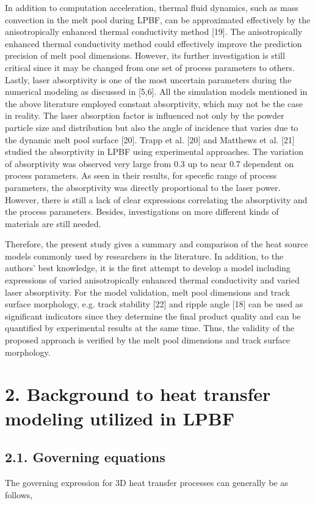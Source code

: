 \documentclass[10pt]{article}
\begin{document}
In addition to computation acceleration, thermal fluid dynamics, such as mass convection in the melt pool during LPBF, can be approximated effectively by the anisotropically enhanced thermal conductivity method [19]. The anisotropically enhanced thermal conductivity method could effectively improve the prediction precision of melt pool dimensions. However, its further investigation is still critical since it may be changed from one set of process parameters to others. Lastly, laser absorptivity is one of the most uncertain parameters during the numerical modeling as discussed in [5,6]. All the simulation models mentioned in the above literature employed constant absorptivity, which may not be the case in reality. The laser absorption factor is influenced not only by the powder particle size and distribution but also the angle of incidence that varies due to the dynamic melt pool surface [20]. Trapp et al. [20] and Matthews et al. [21] studied the absorptivity in LPBF using experimental approaches. The variation of absorptivity was observed very large from 0.3 up to near 0.7 dependent on process parameters. As seen in their results, for specefic range of process parameters, the absorptivity was directly proportional to the laser power. However, there is still a lack of clear expressions correlating the absorptivity and the process parameters. Besides, investigations on more different kinds of materials are still needed.

Therefore, the present study gives a summary and comparison of the heat source models commonly used by researchers in the literature. In addition, to the authors' best knowledge, it is the first attempt to develop a model including expressions of varied anisotropically enhanced thermal conductivity and varied laser absorptivity. For the model validation, melt pool dimensions and track surface morphology, e.g. track stability [22] and ripple angle [18] can be used as significant indicators since they determine the final product quality and can be quantified by experimental results at the same time. Thus, the validity of the proposed approach is verified by the melt pool dimensions and track surface morphology.

\section*{2. Background to heat transfer modeling utilized in LPBF}
\subsection*{2.1. Governing equations}
The governing expression for 3D heat transfer processes can generally be as follows,
\end{document}
